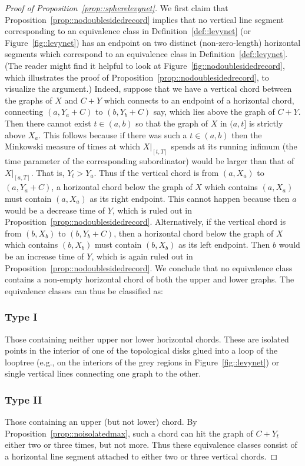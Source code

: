 \documentclass[JEP,XML,SOM,Unicode]{cedram}
\theoremstyle{plain}
\numberwithin{theorem}{section}
\theoremstyle{definition}
\begin{document}
\begin{proof}[Proof of Proposition~\ref{prop::spherelevynet}]
We first claim that Proposition~\ref{prop::nodoublesidedrecord} implies that no vertical line segment corresponding to an equivalence class in Definition~\ref{def::levynet} (or Figure~\ref{fig::levynet}) has an endpoint on two distinct (non-zero-length) horizontal segments which correspond to an equivalence class in Definition~\ref{def::levynet}. (The reader might find it helpful to look at Figure~\ref{fig::nodoublesidedrecord}, which illustrates the proof of Proposition~\ref{prop::nodoublesidedrecord}, to visualize the argument.) Indeed, suppose that we have a vertical chord between the graphs of $X$ and $C+Y$ which connects to an endpoint of a horizontal chord, connecting $(a,Y_a+C)$ to $(b,Y_b+C)$ say, which lies above the graph of $C+Y$. Then there cannot exist $t \in (a,b)$ so that the graph of $X$ in $(a,t]$ is strictly above $X_a$. This follows because if there was such a $t \in (a,b)$ then the Minkowski measure of times at which $X|_{[t,T]}$ spends at its running infimum (\ie the time parameter of the corresponding subordinator) would be larger than that of $X|_{[a,T]}$. That is, $Y_t > Y_a$. Thus if the vertical chord is from $(a,X_a)$ to $(a,Y_a+C)$, a horizontal chord below the graph of $X$ which contains $(a,X_a)$ must contain $(a,X_a)$ as its right endpoint. This cannot happen because then $a$ would be a decrease time of $Y$, which is ruled out in Proposition~\ref{prop::nodoublesidedrecord}. Alternatively, if the vertical chord is from $(b,X_b)$ to $(b,Y_b+C)$, then a horizontal chord below the graph of $X$ which contains $(b,X_b)$ must contain $(b,X_b)$ as its left endpoint. Then $b$ would be an increase time of $Y$, which is again ruled out in Proposition~\ref{prop::nodoublesidedrecord}. We conclude that no equivalence class contains a non-empty horizontal chord of both the upper and lower graphs. The equivalence classes can thus be classified as:\enlargethispage{.8\baselineskip}%

\subsubsection*{Type I}
Those containing neither upper nor lower horizontal chords. These are isolated points in the interior of one of the topological disks glued into a loop of the looptree (e.g., on the interiors of the grey regions in Figure~\ref{fig::levynet}) or single vertical lines connecting one graph to the other.
\subsubsection*{Type II}
Those containing an upper (but not lower) chord. By Proposition~\ref{prop::noisolatedmax}, such a chord can hit the graph of $C+Y_t$ either two or three times, but not more. Thus these equivalence classes consist of a horizontal line segment attached to either two or three vertical chords.

\end{proof}
\end{document}
